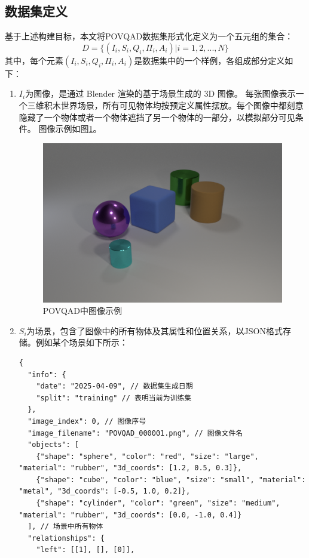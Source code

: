 \subsection{数据集定义}
基于上述构建目标，本文将POVQAD数据集形式化定义为一个五元组的集合：
$$D = \{ (I_i,S_i,Q_i,\Pi_i ,A_i) | i=1,2,...,N \}$$
其中，每个元素$(I_i,S_i,Q_i,\Pi_i ,A_i)$是数据集中的一个样例，各组成部分定义如下：
\begin{enumerate}[nosep]
\item \textbf{$I_i$}为图像，是通过 Blender 渲染的基于场景生成的 3D 图像。
每张图像表示一个三维积木世界场景，所有可见物体均按预定义属性摆放。每个图像中都刻意隐藏了一个物体或者一个物体遮挡了另一个物体的一部分，以模拟部分可见条件。
图像示例如图\ref{POVQAD-figure}。
\begin{figure}
\centering
\includegraphics[scale=0.6]{figures/POVQAD中图像示例.png}
\caption{POVQAD中图像示例}
\label{POVQAD-figure}
\end{figure}
\item \textbf{$S_i$}为场景，包含了图像中的所有物体及其属性和位置关系，以JSON格式存储。例如某个场景如下所示：
\begin{lstlisting}
{
  "info": {
    "date": "2025-04-09", // 数据集生成日期
    "split": "training" // 表明当前为训练集
  },
  "image_index": 0, // 图像序号
  "image_filename": "POVQAD_000001.png", // 图像文件名
  "objects": [
    {"shape": "sphere", "color": "red", "size": "large", "material": "rubber", "3d_coords": [1.2, 0.5, 0.3]},
    {"shape": "cube", "color": "blue", "size": "small", "material": "metal", "3d_coords": [-0.5, 1.0, 0.2]},
    {"shape": "cylinder", "color": "green", "size": "medium", "material": "rubber", "3d_coords": [0.0, -1.0, 0.4]}
  ], // 场景中所有物体
  "relationships": {
    "left": [[1], [], [0]],

\end{lstlisting}
\end{enumerate}
